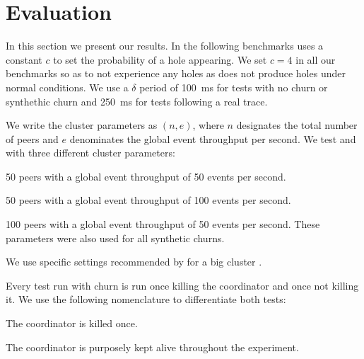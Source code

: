 
\section{Evaluation}
\label{sec:evaluation}
In this section we present our results. In the following benchmarks \epto uses a constant $c$ to set the probability of a hole appearing. We set $c = 4$ in all our benchmarks so as to not experience any holes as \jgroups does not produce holes under normal conditions. We use a $\delta$ period of \SI{100}{\milli\second} for tests with no churn or synthethic churn and \SI{250}{\milli\second} for tests following a real trace.
\par
We write the cluster parameters as $(n,e)$, where $n$ designates the total number of peers and $e$ denominates the global event throughput per second. We test \epto and \jgroups with three different cluster parameters:
\begin{description}[\IEEEsetlabelwidth{$(100,100)$:}]
	\item[\textbf{$(50,50)$}:] 50 peers with a global event throughput of 50 events per second.
	\item[\textbf{$(50,100)$}:] 50 peers with a global event throughput of 100 events per second.
	\item[\textbf{$(100,50)$}:] 100 peers with a global event throughput of 50 events per second. These parameters were also used for all synthetic churns.
\end{description}
\par 
We use specific settings recommended by \jgroups for a big cluster \autocite{udp-largecluster}.
\par
Every \jgroups test run with churn is run once killing the coordinator and once not killing it. We use the following nomenclature to differentiate both tests:
\begin{description}
	\item[\textbf{\jgroups-coord}:] The coordinator is killed once.
	\item[\textbf{\jgroups-nocoord}:] The coordinator is purposely kept alive throughout the experiment.
\end{description}
